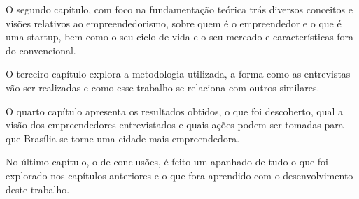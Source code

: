 O segundo capítulo, com foco na fundamentação teórica trás diversos conceitos e visões relativos ao empreendedorismo, sobre quem é o empreendedor e o que é uma startup, bem como o seu ciclo de vida e o seu mercado e características fora do convencional. 

O terceiro capítulo explora a metodologia utilizada, a forma como as entrevistas vão ser realizadas e como esse trabalho se relaciona com outros similares.

O quarto capítulo apresenta os resultados obtidos, o que foi descoberto, qual a visão dos empreendedores entrevistados e quais ações podem ser tomadas para que Brasília se torne uma cidade mais empreendedora.

No último capítulo, o de conclusões, é feito um apanhado de tudo o que foi explorado nos capítulos anteriores e o que fora aprendido com o desenvolvimento deste trabalho. 
